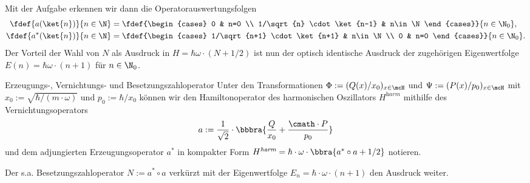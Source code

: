 \documentclass{subfiles}
\begin{document}
        Mit der Aufgabe erkennen wir dann die Operatorauswertungsfolgen
        \begin{align*}
            \fdef{a(\ket{n})}{n\in\N} &= \fdef{\begin{cases}
                0 & n=0 \\
                1/\sqrt{n} \cdot \ket{n-1} & n\in\N
            \end{cases}}{n\in\N_0}, \\
            \fdef{a^*(\ket{n})}{n\in\N} &= \fdef{\begin{cases}
                1/\sqrt{n+1} \cdot \ket{n+1} & n\in\N \\
                0 & n=0
            \end{cases}}{n\in\N_0}.
        \end{align*}
        Der Vorteil der Wahl von $N$ als Ausdruck in $H = \hbar\omega\cdot(N + 1/2)$ ist nun der optisch identische Ausdruck der zugehörigen Eigenwertfolge $E(n) = \hbar\omega\cdot (n+1)$ für $n\in\N_0$.
        
        \begin{mdef}{Erzeugungs-, Vernichtungs- und Besetzungszahloperator}
            Unter den Transformationen $\Phi:=(Q(x)/x_0)_{x\in\mcH}$ und $\Psi:=(P(x)/p_0)_{x\in\mcH}$ mit $x_0 := \sqrt{\hbar/(m\cdot\omega)}$ und $p_0 := \hbar/x_0$ können wir den Hamiltonoperator des harmonischen Oszillators $H^\textit{harm}$ mithilfe des Vernichtungsoperators
            \[
                a:=\frac{1}{\sqrt{2}}\cdot\bbbra{\frac{Q}{x_0} + \frac{\cmath\cdot P}{p_0}}
            \]
            und dem adjungierten Erzeugungsoperator $a^*$ in kompakter Form $H^\textit{harm} = \hbar\cdot\omega\cdot\bbra{a^*\circ a + 1/2}$ notieren. 

            Der s.a. Besetzungszahloperator $N:=a^*\circ a$ verkürzt mit der Eigenwertfolge $E_n = \hbar\cdot\omega\cdot(n+1)$ den Ausdruck weiter. 
        \end{mdef}
\end{document}
